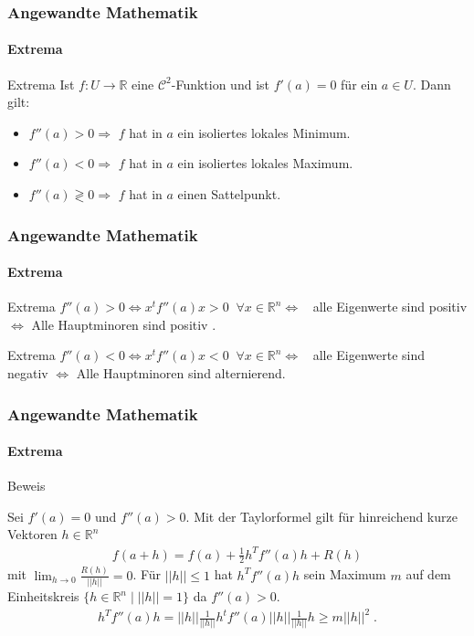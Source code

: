 \documentclass{beamer}
\begin{document}
\begin{frame}
    \frametitle{Angewandte Mathematik}
\framesubtitle{Extrema}
    \begin{block}{Extrema}
 Ist $f: U  \to \mathbb{R}$ eine $\mathcal{C}^2$-Funktion und ist $f'(a) = 0$ für ein $a \in U$. Dann gilt:
\begin{itemize}
\item $f''(a) > 0 \Rightarrow $ $f$ hat in $a$ ein isoliertes lokales Minimum.
\item $f''(a) < 0 \Rightarrow $ $f$ hat in $a$ ein isoliertes lokales Maximum.
\item $f''(a) \gtrless 0 \Rightarrow $ $f$ hat in $a$ einen Sattelpunkt.
\end{itemize} 
\end{block}
 \end{frame}


\begin{frame}
    \frametitle{Angewandte Mathematik}
\framesubtitle{Extrema}
    \begin{block}{Extrema}
$f''(a) > 0 \Leftrightarrow x^t f''(a) x > 0 \; \; \forall x \in \mathbb{R}^n \Leftrightarrow \; \; $ alle Eigenwerte sind positiv $\Leftrightarrow$ Alle Hauptminoren sind positiv . 
\end{block}
    \begin{block}{Extrema}
$f''(a) < 0 \Leftrightarrow x^t f''(a) x < 0 \; \; \forall x \in \mathbb{R}^n \Leftrightarrow \; \; $ alle Eigenwerte sind negativ $\Leftrightarrow$ Alle Hauptminoren sind alternierend. 
\end{block}
 \end{frame}



\begin{frame}
    \frametitle{Angewandte Mathematik}
\framesubtitle{Extrema}
    \begin{block}{Beweis}

Sei $f'(a) = 0$ und $f''(a) > 0$. Mit der Taylorformel gilt für hinreichend kurze Vektoren $h \in \mathbb{R}^n$
\begin{align*}
f(a + h) = f(a) + \frac{1}{2} h^T f''(a) h + R(h)
\end{align*}
mit $\lim_{h \to 0} \frac{R(h)}{ ||h||} = 0$. Für $||h|| \leq 1$ hat $ h^T f''(a) h $ sein Maximum $m$ auf dem Einheitskreis $\{ h \in \mathbb{R}^n \; | \; ||h|| = 1 \}$ da $f''(a) > 0$.
\begin{align*}
 h^T f''(a) h  = ||h|| \frac{1}{||h||} h^t  f''(a)  ||h|| \frac{1}{||h||} h \geq m ||h||^2 \;.
\end{align*}
\end{block}
 \end{frame}
\end{document}
